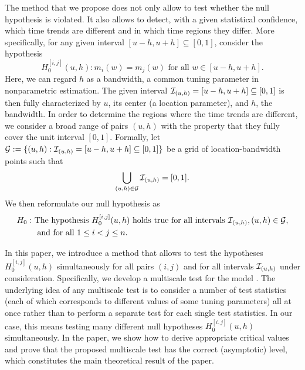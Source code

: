 \documentclass[a4paper,12pt]{article}
\makeatletter
\renewcommand{\eqref}[1]{\tagform@{\ref{#1}}}
\makeatother
\begin{document}
The method that we propose does not only allow to test whether the null hypothesis is violated. It also allows to detect, with a given statistical confidence, which time trends are different and in which time regions they differ. More specifically, for any given interval $[u-h,u+h] \subseteq [0,1]$, consider the hypothesis
\[ H_0^{[i,j]}(u,h): m_i(w) = m_j(w) \text{ for all } w \in [u-h,u+h]. \] 
Here, we can regard $h$ as a bandwidth, a common tuning parameter in nonparametric estimation. The given interval $\mathcal{I}_{(u, h)} = [u-h,u+h] \subseteq [0,1]$ is then fully characterized by $u$, its center (a location parameter), and $h$, the bandwidth. In order to determine the regions where the time trends are different, we consider a broad range of pairs $(u, h)$ with the property that they fully cover the unit interval $[0, 1]$. Formally, let \linebreak $\mathcal{G} := \{(u, h): \mathcal{I}_{(u, h)} = [u-h, u+h] \subseteq [0,1]\}$ be a grid of location-bandwidth points such that %
\begin{align*}
\bigcup_{(u, h) \in \mathcal{G}}  \mathcal{I}_{(u, h)} = [0,1].
\end{align*}
We then reformulate our null hypothesis \eqref{eq:null} as
\begin{align*}
H_0: \ & \text{The hypothesis } H_0^{[i,j]}(u,h) \text{ holds true for all intervals }  \mathcal{I}_{(u, h)}, (u, h) \in \mathcal{G}, \\ & \text{ and for all } 1 \le i < j \le n. 
\end{align*} 

In this paper, we introduce a method that allows to test the hypotheses $H_0^{[i,j]}(u,h)$  simultaneously for all pairs $(i, j)$ and for all intervals $\mathcal{I}_{(u, h)}$ under consideration. Specifically, we develop a multiscale test for the model \eqref{eq:model}. The underlying idea of any multiscale test is to consider a number of test statistics (each of which corresponds to different values of some tuning parameters) all at once rather than to perform a separate test for each single test statistics. In our case, this means testing many different null hypotheses $H_0^{[i,j]}(u,h)$ simultaneously. In the paper, we show how to derive appropriate critical values and prove that the proposed multiscale test has the correct (asymptotic) level, which constitutes the main theoretical result of the paper.
\end{document}

